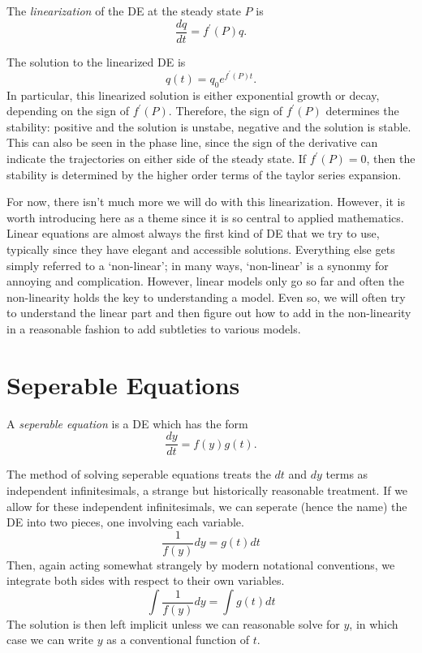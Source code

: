 \documentclass[fleqn,letterpaper]{report}
\begin{document}
\begin{defn}
The \emph{linearization} of the DE at the steady state $P$ is
\begin{equation*}
\frac{dq}{dt} = f^\prime(P) q.
\end{equation*}
\end{defn}

The solution to the linearized DE is 
\begin{equation*}
q(t) = q_0 e^{f^\prime(P) t}.
\end{equation*}
In particular, this linearized solution is either
exponential growth or decay, depending on the sign of
$f^\prime(P)$. Therefore, the sign of $f^\prime(P)$
determines the stability: positive and the solution is
unstabe, negative and the solution is stable. This can also
be seen in the phase line, since the sign of the derivative
can indicate the trajectories on either side of the steady
state. If $f^\prime(P) = 0$, then the stability is determined
by the higher order terms of the taylor series expansion.

For now, there isn't much more we will do with this
linearization. However, it is worth introducing here as a
theme since it is so central to applied mathematics. Linear
equations are almost always the first kind of DE that we try
to use, typically since they have elegant and accessible
solutions. Everything else gets simply referred to a
`non-linear'; in many ways, `non-linear' is a synonmy for
annoying and complication. However, linear models only go so
far and often the non-linearity holds the key to understanding
a model. Even so, we will often try to understand the
linear part and then figure out how to add in the
non-linearity in a reasonable fashion to add subtleties to
various models. 

\section{Seperable Equations}
\label{seperable-des}

\begin{defn}
A \emph{seperable equation} is a DE which has the form 
\begin{equation*}
\frac{dy}{dt} = f(y) g(t).
\end{equation*}
\end{defn}

The method of solving seperable equations treats the $dt$ and
$dy$ terms as independent infinitesimals, a strange but
historically reasonable treatment. If we allow for these
independent infinitesimals, we can seperate (hence the name)
the DE into two pieces, one involving each variable.
\begin{equation*}
\frac{1}{f(y)} dy = g(t) dt 
\end{equation*}
Then, again acting somewhat strangely by modern notational
conventions, we integrate both sides with respect to their own
variables.
\begin{equation*}
\int \frac{1}{f(y)} dy = \int g(t) dt
\end{equation*}
The solution is then left implicit unless we can reasonable
solve for $y$, in which case we can write $y$ as a
conventional function of $t$.
\end{document}
